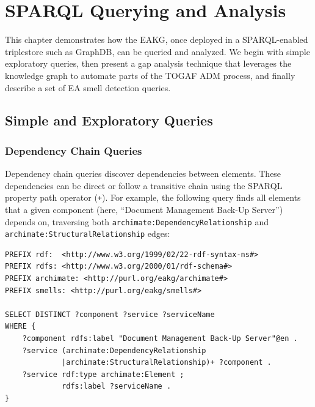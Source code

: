 
\chapter{SPARQL Querying and Analysis}
\label{chap:queries}

This chapter demonstrates how the EAKG, once deployed in a SPARQL-enabled triplestore such as GraphDB, can be queried and analyzed. We begin with simple exploratory queries, then present a gap analysis technique that leverages the knowledge graph to automate parts of the TOGAF ADM process, and finally describe a set of EA smell detection queries.

\section{Simple and Exploratory Queries}
\label{sec:simple-queries}

\subsection{Dependency Chain Queries}
\label{subsec:dependency-chains}

Dependency chain queries discover dependencies between elements. These dependencies can be direct or follow a transitive chain using the SPARQL property path operator (\texttt{+}). For example, the following query finds all elements that a given component (here, ``Document Management Back-Up Server'') depends on, traversing both \texttt{archimate:DependencyRelationship} and \texttt{archimate:StructuralRelationship} edges:

\begin{lstlisting}[caption={Dependency chain: elements that a given component depends on}]
PREFIX rdf:  <http://www.w3.org/1999/02/22-rdf-syntax-ns#>
PREFIX rdfs: <http://www.w3.org/2000/01/rdf-schema#>
PREFIX archimate: <http://purl.org/eakg/archimate#>
PREFIX smells: <http://purl.org/eakg/smells#>

SELECT DISTINCT ?component ?service ?serviceName
WHERE {
    ?component rdfs:label "Document Management Back-Up Server"@en .
    ?service (archimate:DependencyRelationship
             |archimate:StructuralRelationship)+ ?component .
    ?service rdf:type archimate:Element ;
             rdfs:label ?serviceName .
}
\end{lstlisting}

